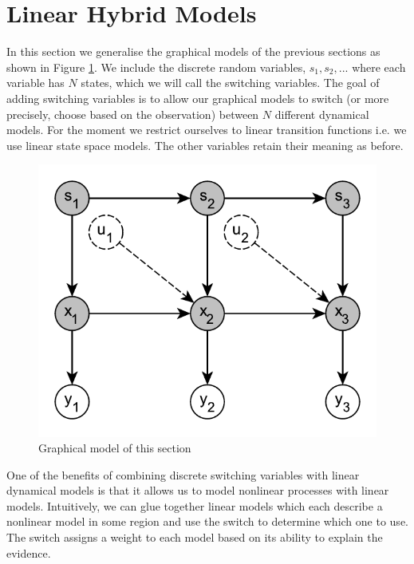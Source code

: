 \documentclass[../masters.tex]{subfiles}
\begin{document}
\graphicspath{{./imgs/}{../imgs/}} %

\section{Linear Hybrid Models}
In this section we generalise the graphical models of the previous sections as shown in Figure \ref{fig_hybridmod1}. We include the discrete random variables, $s_1, s_2,...$ where each variable has $N$ states, which we will call the switching variables. The goal of adding switching variables is to allow our graphical models to switch (or more precisely, choose based on the observation) between $N$ different dynamical models. For the moment we restrict ourselves to linear transition functions i.e. we use linear state space models. The other variables retain their meaning as before.     
\begin{figure}[H] 
\centering
\includegraphics[scale=1.0]{hybrid_model.pdf}
\caption{Graphical model of this section}
\label{fig_hybridmod1}
\end{figure}
One of the benefits of combining discrete switching variables with linear dynamical models is that it allows us to model nonlinear processes with linear models. Intuitively, we can glue together linear models which each describe a nonlinear model in some region and use the switch to determine which one to use. The switch assigns a weight to each model based on its ability to explain the evidence. 
\end{document}
